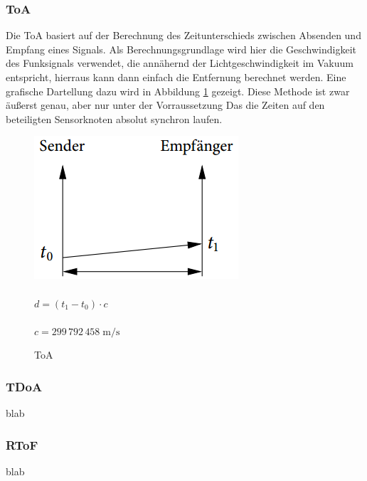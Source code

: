 \subsubsection{\ac{ToA}}
Die \ac{ToA} basiert auf der Berechnung des Zeitunterschieds zwischen Absenden und Empfang eines Signals. Als Berechnungsgrundlage wird hier
die Geschwindigkeit des Funksignals verwendet, die annähernd der Lichtgeschwindigkeit im Vakuum entspricht, hierraus kann dann einfach die 
Entfernung berechnet werden. Eine grafische Dartellung dazu wird in Abbildung \ref{fig:ToA} gezeigt. Diese Methode ist zwar äußerst genau, aber nur unter der Vorraussetzung Das die Zeiten auf den beteiligten Sensorknoten absolut synchron laufen.  
\begin{figure}
  \caption{ToA}
    \includegraphics[scale=0.35]{img/time1}\\~\\

    $d = (t_{1} - t_{0}) \cdot c$\\~\\
    $c=299\,792\,458\;\mathrm{m/s}$
    \label{fig:ToA}
\end{figure}
\subsubsection{\ac{TDoA}}
blab
\subsubsection{\ac{RToF}}
blab
